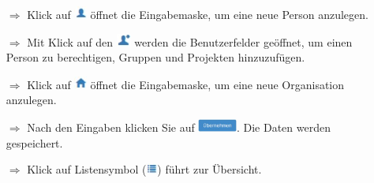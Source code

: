 \documentclass{article}
\begin{document}
\begin{multicols}{2}

\begin{tcolorbox}[colback=blue!5,colframe=blue!40!black,title=Personen und Organisationen anlegen]
\begin{itemize}
  \item[$\Longrightarrow$] Klick auf \includegraphics[height=12pt]{Icons/Person.jpg} öffnet die Eingabemaske, um eine neue Person anzulegen.
	\item[$\Longrightarrow$] Mit Klick auf den \includegraphics[height=12pt]{Icons/User.jpg} werden die Benutzerfelder geöffnet, um einen Person zu berechtigen, Gruppen und Projekten hinzuzufügen.
  \item[$\Longrightarrow$] Klick auf \includegraphics[height=12pt]{Icons/Haus.jpg} öffnet die Eingabemaske, um eine neue Organisation anzulegen.
  \item[$\Longrightarrow$] Nach den Eingaben klicken Sie auf \includegraphics[height=12pt]{Icons/B_Uebernehmen.jpg}. Die Daten werden gespeichert.
  \item[$\Longrightarrow$] Klick auf Listensymbol (\includegraphics[height=10pt]{Icons/Listensymbol_zurueck.jpg}) führt zur Übersicht.

\end{itemize}
\end{tcolorbox}


\end{multicols}
\end{document}
